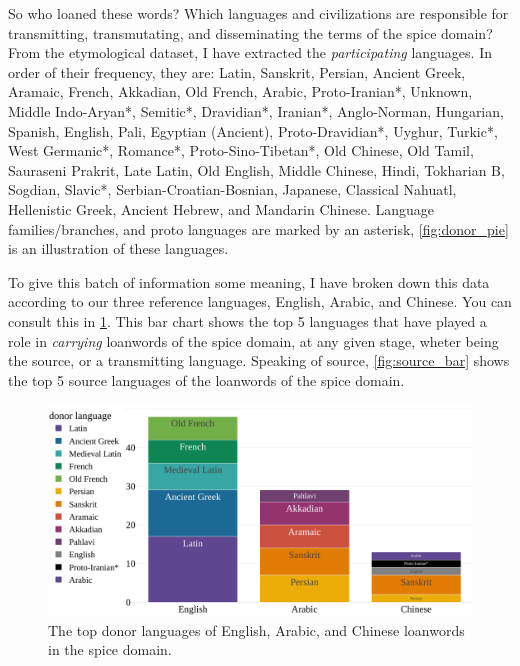 So who loaned these words? Which languages and civilizations are responsible for transmitting, transmutating, and disseminating the terms of the spice domain? From the etymological dataset, I have extracted the \textit{participating} languages. In order of their frequency, they are: Latin, Sanskrit, Persian, Ancient Greek, Aramaic, French, Akkadian, Old French, Arabic, Proto-Iranian*, Unknown, Middle Indo-Aryan*, Semitic*, Dravidian*, Iranian*, Anglo-Norman, Hungarian, Spanish, English, Pali, Egyptian (Ancient), Proto-Dravidian*, Uyghur, Turkic*, West Germanic*, Romance*, Proto-Sino-Tibetan*, Old Chinese, Old Tamil, Sauraseni Prakrit, Late Latin, Old English, Middle Chinese, Hindi, Tokharian B, Sogdian, Slavic*, Serbian-Croatian-Bosnian, Japanese, Classical Nahuatl, Hellenistic Greek, Ancient Hebrew, and Mandarin Chinese. Language families/branches, and proto languages are marked by an asterisk, \cref{fig:donor_pie} is an illustration of these languages.

To give this batch of information some meaning, I have broken down this data according to our three reference languages, English, Arabic, and Chinese. You can consult this in \cref{fig:donor_bar}. This bar chart shows the top 5 languages that have played a role in \textit{carrying} loanwords of the spice domain, at any given stage, wheter being the source, or a transmitting language. Speaking of source, \cref{fig:source_bar} shows the top 5 source languages of the loanwords of the spice domain.

\begin{figure}[!ht]
  \centering
  \includegraphics[width=\linewidth]{imgs/plots/donor_bar.pdf}
  \caption{The top donor languages of English, Arabic, and Chinese loanwords in the spice domain.}
  \label{fig:donor_bar}
\end{figure}

